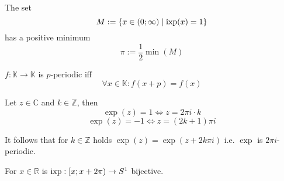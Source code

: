 \begin{theorem}
   The set
   \[M := \{x \in (0; \infty) \mid \operatorname{ixp}(x) = 1\}\]
   has a positive minimum
   \[\pi := \frac{1}{2} \min(M)\]
\end{theorem}

\begin{definition}
   \(f: \mathbb{K} \to \mathbb{K}\) is \(p\)-periodic iff
   \[\forall x \in \mathbb{K}: f(x + p) = f(x)\]
\end{definition}

\begin{theorem}
   Let \(z \in \mathbb{C}\) and \(k \in \mathbb{Z}\), then
   \[\exp(z) = 1 \iff z = 2 \pi i \cdot k\]
   \[\exp(z) = -1 \iff z = (2k + 1)\pi i\]
\end{theorem}
\begin{remark}
   It follows that for \(k \in \mathbb{Z}\) holds \(\exp(z) = \exp(z + 2k\pi i)\) i.e. \(\exp\) is \(2\pi i\)-periodic.
\end{remark}

\begin{theorem}
   For \(x \in \mathbb{R}\) is \(\operatorname{ixp}: [x; x + 2\pi) \to S^1\) bijective.
\end{theorem}

